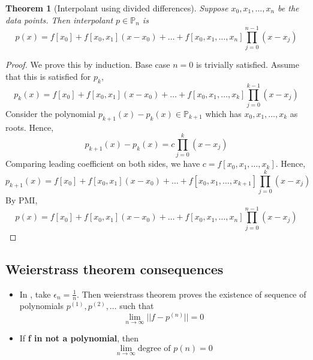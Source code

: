 \documentclass{article}
\newtheorem*{theorem}{Theorem}
\begin{document}
	\begin{theorem}[Interpolant using divided differences]
		Suppose $x_0,x_1,\hdots,x_n$ be the data points. Then interpolant $p \in \mathbb{P}_n$ is
		\[\boxed{p(x)=f[x_0]+f[x_0,x_1](x-x_0)+ \hdots +f[x_0,x_1,\hdots,x_n] \prod_{j=0}^{n-1}(x-x_j)}\]
	\end{theorem}

	\begin{proof}
		We prove this by induction. Base case $n=0$ is trivially satisfied.
		Assume that this is satisfied for $p_{k}$,
		\[p_k(x)=f[x_0]+f[x_0,x_1](x-x_0)+ \hdots +f[x_0,x_1,\hdots,x_k] \prod_{j=0}^{k-1}(x-x_j)\]
		Consider the polynomial $p_{k+1}(x)-p_k(x) \in \mathbb{P}_{k+1}$ which has $x_0,x_1,\hdots,x_k$ as roots. Hence,
		\[p_{k+1}(x)-p_k(x) = c\prod_{j=0}^k(x-x_j)\]
		Comparing leading coefficient on both sides, we have $c=f[x_0,x_1,\hdots,x_k]$. Hence,
		\[p_{k+1}(x)=f[x_0]+f[x_0,x_1](x-x_0)+ \hdots +f[x_0,x_1,\hdots,x_{k+1}] \prod_{j=0}^{k}(x-x_j)\]
		By PMI,
		\[p(x)=f[x_0]+f[x_0,x_1](x-x_0)+ \hdots +f[x_0,x_1,\hdots,x_n] \prod_{j=0}^{n-1}(x-x_j)\]


	\end{proof}




\subsection{Weierstrass theorem consequences}
\begin{itemize}
	\item In , take $\epsilon_n = \frac{1}{n}$. Then weierstrass theorem proves the existence of sequence of polynomials $p^{(1)}, p^{(2)}, \hdots$ such that 
		\[\lim_{n\rightarrow \infty} ||f-p^{(n)}||=0\]
	\item If \textbf{f in not a polynomial}, then 
		\[\lim_{n\rightarrow \infty} \text{degree of }p{(n)} = 0\]
\end{itemize}
\end{document}
